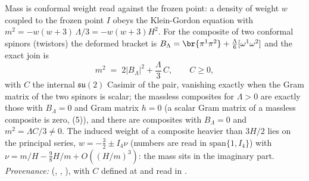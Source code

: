 Mass is conformal weight read against the frozen point: a density of weight $w$ coupled to the frozen point $I$ obeys the Klein-Gordon equation with $m^{2} = -w(w+3)\,\Lambda/3 = -w(w+3)H^{2}$. For the composite of two conformal spinors (twistors) the deformed bracket is $B_{\Lambda} = \br{\pi^{1}\pi^{2}} + \tfrac{\Lambda}{6}[\omega^{1}\omega^{2}]$ and the exact join is
\[
m^{2} \;=\; 2|B_{\Lambda}|^{2} + \frac{\Lambda}{3}\,C, \qquad C \ge 0,
\]
with $C$ the internal $\mathfrak{su}(2)$ Casimir of the pair, vanishing exactly when the Gram matrix of the two spinors is scalar; the massless composites for $\Lambda > 0$ are exactly those with $B_{\Lambda} = 0$ and Gram matrix $h = 0$ (a scalar Gram matrix of a massless composite is zero, (5)), and there are composites with $B_{\Lambda} = 0$ and $m^{2} = \Lambda C/3 \ne 0$. The induced weight of a composite heavier than $3H/2$ lies on the principal series, $w = -\tfrac32 \pm I_4\nu$ (numbers are read in $\mathrm{span}\{1, I_4\}$) with $\nu = m/H - \tfrac98 H/m + O((H/m)^{3})$: the mass sits in the imaginary part. \emph{Provenance:} \cite[Thm.~3.1, Thm.~5.6, Prop.~5.9]{ButlerT11} (, , ), with $C$ defined at \cite[eq.~(9)]{ButlerT11} and read in \cite[Rem.~5.10]{ButlerT11}.
